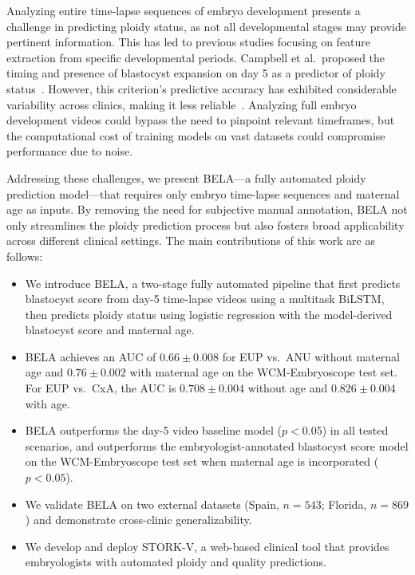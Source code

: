 \documentclass[12pt]{article}
\begin{document}
Analyzing entire time-lapse sequences of embryo development presents a challenge in predicting ploidy status, as not all developmental stages may provide pertinent information. This has led to previous studies focusing on feature extraction from specific developmental periods. Campbell et al.\ proposed the timing and presence of blastocyst expansion on day 5 as a predictor of ploidy status~\citep{campbell2013modelling}. However, this criterion's predictive accuracy has exhibited considerable variability across clinics, making it less reliable~\citep{reignier2019performance}. Analyzing full embryo development videos could bypass the need to pinpoint relevant timeframes, but the computational cost of training models on vast datasets could compromise performance due to noise.

Addressing these challenges, we present BELA---a fully automated ploidy prediction model---that requires only embryo time-lapse sequences and maternal age as inputs. By removing the need for subjective manual annotation, BELA not only streamlines the ploidy prediction process but also fosters broad applicability across different clinical settings. The main contributions of this work are as follows:

\begin{itemize}
    \item We introduce BELA, a two-stage fully automated pipeline that first predicts blastocyst score from day-5 time-lapse videos using a multitask BiLSTM, then predicts ploidy status using logistic regression with the model-derived blastocyst score and maternal age.
    \item BELA achieves an AUC of $0.66 \pm 0.008$ for EUP vs.\ ANU without maternal age and $0.76 \pm 0.002$ with maternal age on the WCM-Embryoscope test set. For EUP vs.\ CxA, the AUC is $0.708 \pm 0.004$ without age and $0.826 \pm 0.004$ with age.
    \item BELA outperforms the day-5 video baseline model ($p < 0.05$) in all tested scenarios, and outperforms the embryologist-annotated blastocyst score model on the WCM-Embryoscope test set when maternal age is incorporated ($p < 0.05$).
    \item We validate BELA on two external datasets (Spain, $n=543$; Florida, $n=869$) and demonstrate cross-clinic generalizability.
    \item We develop and deploy STORK-V, a web-based clinical tool that provides embryologists with automated ploidy and quality predictions.
\end{itemize}
\end{document}
